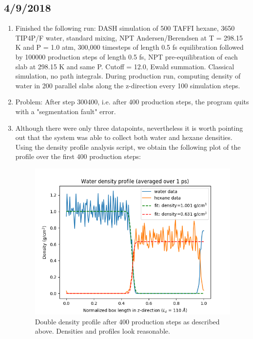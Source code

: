 \documentclass[12pt,reqno]{amsart}
\numberwithin{equation}{section}
\begin{document}
\subsection{4/9/2018}

\begin{enumerate}
\item Finished the following run: DASH simulation of 500 TAFFI hexane, 3650 TIP4P/F water, standard mixing, NPT Andersen/Berendsen at T = 298.15 K and P = 1.0 atm, 300,000 timesteps of length 0.5 fs equilibration followed by 100000 production steps of length 0.5 fs, NPT pre-equilibration of each slab at 298.15 K and same P.  Cutoff = 12.0, Ewald summation.  Classical simulation, no path integrals.  During production run, computing density of water in 200 parallel slabs along the z-direction every 100 simulation steps.

\item Problem: After step 300400, i.e. after 400 production steps, the program quits with a "segmentation fault" error.  

\item Although there were only three datapoints, nevertheless it is worth pointing out that the system was able to collect both water and hexane densities.  Using the density profile analysis script, we obtain the following plot of the profile over the first 400 production steps: 

\begin{figure}[H]
\centering
\includegraphics[scale=0.4]{double_profile}
\caption{Double density profile after 400 production steps as described above.  Densities and profiles look reasonable.}
\end{figure}


\end{enumerate}
\end{document}
